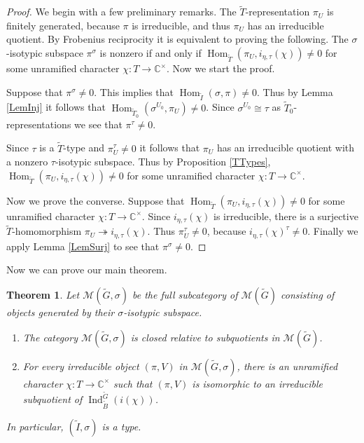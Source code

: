 \documentclass[10pt, letterpaper]{amsart}
\theoremstyle{plain}
\newtheorem{Thm}[equation]{Theorem}
\theoremstyle{definition}
\numberwithin{equation}{section}
\newcommand{\Gt}{\widetilde{G}}
\newcommand{\It}{\widetilde{I}}
\newcommand{\Tt}{\widetilde{T}}
\newcommand{\Ind}{\operatorname{Ind}}
\newcommand{\Hom}{\operatorname{Hom}}
\begin{document}
\begin{proof}
    We begin with a few preliminary remarks. The $\Tt$-representation $\pi_{U}$ is finitely generated, because $\pi$ is irreducible, and thus $\pi_{U}$ has an irreducible quotient. By Frobenius reciprocity it is equivalent to proving the following. The $\sigma$-isotypic subspace $\pi^{\sigma}$ is nonzero if and only if $\Hom_{\Tt}(\pi_{U},i_{\eta,\tau}(\chi))\neq 0$ for some unramified character $\chi:T\rightarrow \mathbb{C}^{\times}$. Now we start the proof.
    
    Suppose that $\pi^{\sigma}\neq 0$. This implies that $\Hom_{\It}(\sigma,\pi)\neq 0$. Thus by Lemma \ref{LemInj} it follows that $\Hom_{\Tt_{0}}(\sigma^{U_{0}},\pi_{U})\neq 0$. Since $\sigma^{U_{0}}\cong\tau$ as $\Tt_{0}$-representations we see that $\pi^{\tau}\neq0$. 

    Since $\tau$ is a $\Tt$-type and $\pi_{U}^{\tau}\neq 0$ it follows that $\pi_{U}$ has an irreducible quotient with a nonzero $\tau$-isotypic subspace. Thus by Proposition \ref{TTypes}, $\Hom_{\Tt}(\pi_{U},i_{\eta,\tau}(\chi))\neq 0$ for some unramified character $\chi:T\rightarrow \mathbb{C}^{\times}$.
    
    Now we prove the converse. Suppose that $\Hom_{\Tt}(\pi_{U},i_{\eta,\tau}(\chi))\neq 0$ for some unramified character $\chi:T\rightarrow \mathbb{C}^{\times}$. Since $i_{\eta,\tau}(\chi)$ is irreducible, there is a surjective $\Tt$-homomorphism $\pi_{U}\twoheadrightarrow i_{\eta,\tau}(\chi)$. Thus $\pi_{U}^{\tau}\neq 0$, because $i_{\eta,\tau}(\chi)^{\tau}\neq 0$. Finally we apply Lemma \ref{LemSurj} to see that $\pi^{\sigma}\neq0$.
\end{proof}

Now we can prove our main theorem. 

\begin{Thm}\label{TypesThm}\label{IType}
Let $\mathcal{M}(\Gt,\sigma)$ be the full subcategory of $\mathcal{M}(\Gt)$ consisting of objects generated by their $\sigma$-isotypic subspace.
	\begin{enumerate}
		\item The category $\mathcal{M}(\Gt,\sigma)$ is closed relative to subquotients in $\mathcal{M}(\Gt)$.\label{SubQuot}
		\item For every irreducible object $(\pi,V)$ in $\mathcal{M}(\Gt,\sigma)$, there is an unramified character $\chi:T\rightarrow \mathbb{C}^{\times}$ such that $(\pi,V)$ is isomorphic to an irreducible subquotient of $\Ind_{\widetilde{B}}^{\Gt}(i(\chi))$.\label{BernComp}
	\end{enumerate}
In particular, $(\It, \sigma)$ is a type.
\end{Thm}
\end{document}
